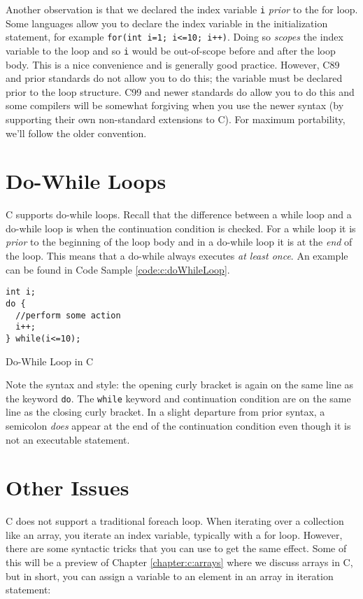 Another observation is that we declared the index variable \texttt{i} 
\emph{prior} to the for loop.  Some languages allow you to declare the index
variable in the initialization statement, for example \texttt{for(int i=1; i<=10; i++)}.
Doing so \emph{scopes} the index variable to the loop and so \texttt{i}
would be out-of-scope before and after the loop body.  This is a nice convenience
and is generally good practice.  However, C89 and prior standards do not allow you
to do this; the variable must be declared prior to the loop structure.  C99 and 
newer standards do allow you to do this and some compilers will be somewhat
forgiving when you use the newer syntax (by supporting their own non-standard
extensions to C).  For maximum portability, we'll follow the older convention.

\section{Do-While Loops}

C supports do-while loops.  Recall that the difference between a
while loop and a do-while loop is when the continuation condition is checked.
For a while loop it is \emph{prior} to the beginning of the loop body and in
a do-while loop it is at the \emph{end} of the loop.  This means that a do-while 
always executes \emph{at least once}.  An example can be found in Code
Sample \ref{code:c:doWhileLoop}.

\begin{listing}
\begin{verbatim}
int i;
do {
  //perform some action
  i++;
} while(i<=10);
\end{verbatim}
  \caption{Do-While Loop in C}
  \label{code:c:doWhileLoop}
\end{listing}

Note the syntax and style: the opening curly bracket is again on the same
line as the keyword \texttt{do}.  The \texttt{while} keyword and
continuation condition are on the same line as the closing curly bracket.
In a slight departure from prior syntax, a semicolon \emph{does} appear
at the end of the continuation condition even though it is not an
executable statement.

\section{Other Issues}
\label{section:c:loops:otherissues}

C does not support a traditional foreach loop.  When iterating over a
collection like an array, you iterate an index variable, typically
with a for loop.  However, there are some syntactic tricks that you can
use to get the same effect.  Some of this will be a preview of Chapter
\ref{chapter:c:arrays} where we discuss arrays in C, but in short, you can
assign a variable to an element in an array in iteration statement:

